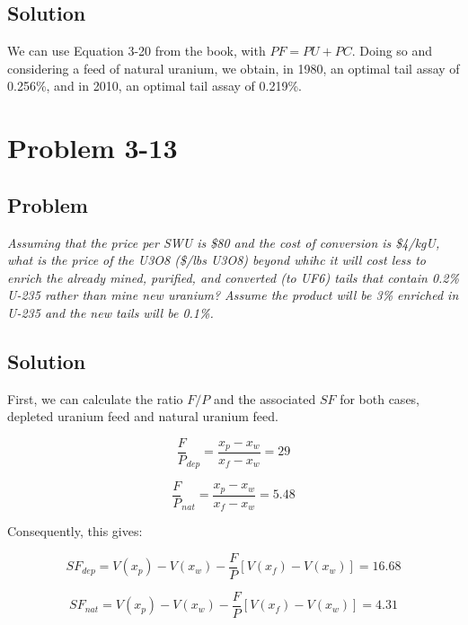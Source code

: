 \subsection{Solution}

We can use Equation 3-20 from the book, with $PF = PU+PC$. Doing so and considering a feed of natural uranium, we obtain, in 1980, an optimal tail assay of 0.256\%, and in 2010, an optimal tail assay of 0.219\%.

\section{Problem 3-13}
\label{prob313}

\subsection{Problem}
\textit{Assuming that the price per SWU is \$80 and the cost of conversion is \$4/kgU, what is the price of the U3O8 (\$/lbs U3O8) beyond whihc it will cost less to enrich the already mined, purified, and converted (to UF6) tails that contain 0.2\% U-235 rather than mine new uranium? Assume the product will be 3\% enriched in U-235 and the new tails will be 0.1\%.}

\subsection{Solution}

First, we can calculate the ratio $F/P$ and the associated $SF$ for both cases, depleted uranium feed and natural uranium feed.

\begin{equation}
\frac{F}{P}_{dep} = \frac{x_p - x_w}{x_f - x_w} = 29
\end{equation}


\begin{equation}
\frac{F}{P}_{nat} = \frac{x_p - x_w}{x_f - x_w} = 5.48
\end{equation}

Consequently, this gives:


\begin{equation}
SF_{dep} = V(x_p) - V(x_w) - \frac{F}{P}\left[V(x_f)-V(x_w)\right] = 16.68
\end{equation}


\begin{equation}
SF_{nat} = V(x_p) - V(x_w) - \frac{F}{P}\left[V(x_f)-V(x_w)\right] = 4.31
\end{equation}

